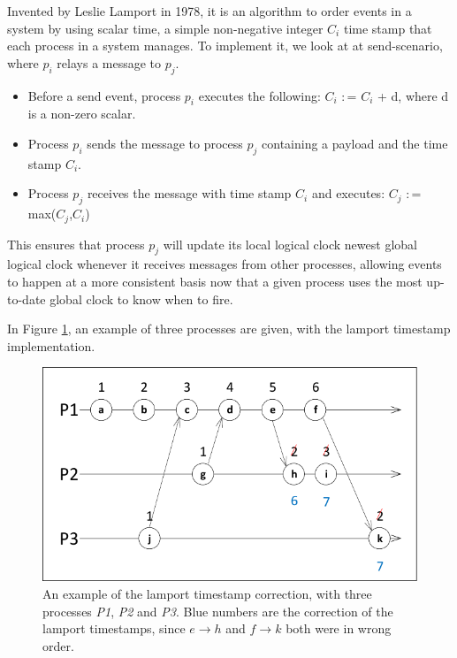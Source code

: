 Invented by Leslie Lamport in 1978, it is an algorithm to order events in a system by using scalar time, a simple non-negative integer $C_i$ time stamp that each process in a system manages. To implement it, we look at at send-scenario, where $p_i$ relays a message to $p_j$.

\begin{itemize}
	\item Before a send event, process $p_i$ executes the following: $C_i$ $\colon$=  $C_i$ + d, where d is a non-zero scalar.
	\item Process $p_i$ sends the message to process $p_j$ containing a payload and the time stamp $C_i$.
	\item Process $p_j$ receives the message with time stamp $C_i$ and executes: $C_j$ $\colon$= max($C_j$,$C_i$) 
\end{itemize}

This ensures that process $p_j$ will update its local logical clock newest global logical clock whenever it receives messages from other processes, allowing events to happen at a more consistent basis now that a given process uses the most up-to-date global clock to know when to fire.

In Figure \ref{fig:lamport}, an example of three processes are given, with the lamport timestamp implementation.


\begin{figure}[H]
	\centering
	\includegraphics[width=0.3\linewidth]{synchronization/logicalClock/fig/lamport.pdf}
	\caption{An example of the lamport timestamp correction, with three processes \textit{P1}, \textit{P2} and \textit{P3}. Blue numbers are the correction of the lamport timestamps, since $e \rightarrow h$ and $f \rightarrow k$ both were in wrong order.}
	\label{fig:lamport}
\end{figure}
